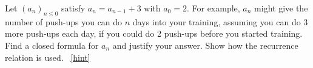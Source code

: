 \documentclass{book}
\begin{document}
\setcounter{project}{143}
\addtocounter{project}{-1}
\begin{activity}[]\label{act-arithmetic}
\hypertarget{p-975}{}%
Let \((a_n)_{n \le 0}\) satisfy \(a_n = a_{n-1} + 3\) with \(a_0 = 2\).  For example, \(a_n\) might give the number of push-ups you can do \(n\) days into your training, assuming you can do 3 more push-ups each day, if you could do 2 push-ups before you started training.  Find a closed formula for \(a_n\) and justify your answer.  Show how the recurrence relation is used.%
~\hfill{\tiny\hyperlink{a-143}{[hint]}\hypertarget{q-143}{}}\end{activity}
\end{document}
